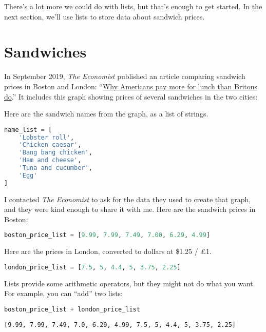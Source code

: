 There's a lot more we could do with lists, but that's enough to get
started. In the next section, we'll use lists to store data about
sandwich prices.

\hypertarget{sandwiches}{%
\section{Sandwiches}\label{sandwiches}}

In September 2019, \emph{The Economist} published an article comparing
sandwich prices in Boston and London:
``\href{https://www.economist.com/finance-and-economics/2019/09/07/why-americans-pay-more-for-lunch-than-britons-do}{Why
Americans pay more for lunch than Britons do}.'' It includes this graph
showing prices of several sandwiches in the two cities:

Here are the sandwich names from the graph, as a list of strings.

\begin{lstlisting}[language=Python,style=source]
name_list = [
    'Lobster roll',
    'Chicken caesar',
    'Bang bang chicken',
    'Ham and cheese',
    'Tuna and cucumber',
    'Egg'
]
\end{lstlisting}

I contacted \emph{The Economist} to ask for the data they used to create
that graph, and they were kind enough to share it with me. Here are the
sandwich prices in Boston:

\begin{lstlisting}[language=Python,style=source]
boston_price_list = [9.99, 7.99, 7.49, 7.00, 6.29, 4.99]
\end{lstlisting}

Here are the prices in London, converted to dollars at \$1.25 / £1.

\begin{lstlisting}[language=Python,style=source]
london_price_list = [7.5, 5, 4.4, 5, 3.75, 2.25]
\end{lstlisting}

Lists provide some arithmetic operators, but they might not do what you
want. For example, you can ``add'' two lists:

\begin{lstlisting}[language=Python,style=source]
boston_price_list + london_price_list
\end{lstlisting}

\begin{lstlisting}[style=output]
[9.99, 7.99, 7.49, 7.0, 6.29, 4.99, 7.5, 5, 4.4, 5, 3.75, 2.25]
\end{lstlisting}


